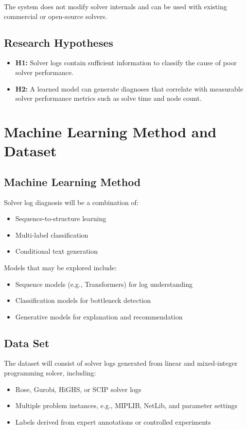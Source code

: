 \documentclass[11pt]{article}
\begin{document}
The system does not modify solver internals and can be used with existing commercial or open-source solvers.

\subsection{Research Hypotheses}

\begin{itemize}
    \item \textbf{H1:} Solver logs contain sufficient information to classify the cause of poor solver performance.
    \item \textbf{H2:} A learned model can generate diagnoses that correlate with measurable solver performance metrics such as solve time and node count.
\end{itemize}


\section{Machine Learning Method and Dataset}

\subsection{Machine Learning Method}
Solver log diagnosis will be a combination of:
\begin{itemize}
    \item Sequence-to-structure learning
    \item Multi-label classification
    \item Conditional text generation
\end{itemize}

\noindent Models that may be explored include:
\begin{itemize}
    \item Sequence models (e.g., Transformers) for log understanding
    \item Classification models for bottleneck detection
    \item Generative models for explanation and recommendation
\end{itemize}

\subsection{Data Set}

The dataset will consist of solver logs generated from linear and mixed-integer programming solcer, including:
\begin{itemize}
    \item Rose, Gurobi, HiGHS, or SCIP solver logs
    \item Multiple problem instances, e.g., MIPLIB, NetLib, and parameter settings
    \item Labels derived from expert annotations or controlled experiments
\end{itemize}
\end{document}

